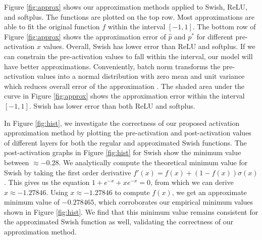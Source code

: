 \documentclass[conference]{IEEEtran}
\begin{document}


Figure \ref{fig:approx} shows our approximation methods applied to Swish, ReLU, and softplus. 
The functions are plotted on the top row.
Most approximations are able to fit the original function $f$ within the interval $[-1, 1]$.
The bottom row of Figure \ref{fig:approx} shows the approximation error of $\hat{p}$ and $p^*$ for different pre-activation $x$ values.
Overall, Swish has lower error than ReLU and softplus.
If we can constrain the pre-activation values to fall within the interval, our model will have better approximations.
Conveniently, batch norm transforms the pre-activation values into a normal distribution with zero mean and unit variance \cite{ioffe2015batch} which reduces overall error of the approximation \cite{chabanne2017privacy}.
The shaded area under the curve in Figure \ref{fig:approx} shows the approximation error within the interval $[-1, 1]$.
Swish has lower error than both ReLU and softplus.

In Figure \ref{fig:hist}, we investigate the correctness of our proposed activation approximation method by plotting the pre-activation and post-activation values of different layers for both the regular and approximated Swish functions.
The post-activation graphs in Figure \ref{fig:hist} for Swish show the minimum value between $\approx -0.28$.
We analytically compute the theoretical minimum value for Swish by taking the first order derivative $f'(x) = f(x) + (1 - f(x)) \sigma(x)$.
This gives us the equation $1 + e^{-x} + xe^{-x} = 0$, from which we can derive $x \approx -1.27846$. 
Using $x \approx -1.27846$ to compute $f(x)$, we get an approximate minimum value of $-0.278465$, which corroborates our empirical minimum values shown in Figure \ref{fig:hist}.
We find that this minimum value remains consistent for the approximated Swish function as well, validating the correctness of our approximation method. 
\end{document}
